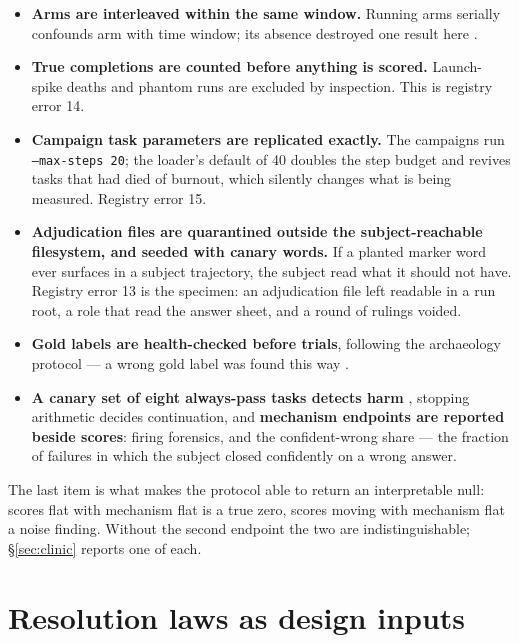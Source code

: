 \begin{itemize}
  \item \textbf{Arms are interleaved within the same window.} Running arms
        serially confounds arm with time window; its absence destroyed one
        result here .
  \item \textbf{True completions are counted before anything is scored.}
        Launch-spike deaths and phantom runs are excluded by inspection.
        This is registry error 14.
  \item \textbf{Campaign task parameters are replicated exactly.} The
        campaigns run \texttt{--max-steps 20}; the loader's default of 40
        doubles the step budget and revives tasks that had died of burnout,
        which silently changes what is being measured. Registry error 15.
  \item \textbf{Adjudication files are quarantined outside the
        subject-reachable filesystem, and seeded with canary words.} If a
        planted marker word ever surfaces in a subject trajectory, the
        subject read what it should not have. Registry error 13 is the
        specimen: an adjudication file left readable in a run root, a role
        that read the answer sheet, and a round of rulings voided.
  \item \textbf{Gold labels are health-checked before trials}, following
        the archaeology protocol --- a wrong gold label was found this way
        .
  \item \textbf{A canary set of eight always-pass tasks detects harm}
        , stopping arithmetic decides continuation, and
        \textbf{mechanism endpoints are reported beside scores}: firing
        forensics, and the confident-wrong share --- the fraction of
        failures in which the subject closed confidently on a wrong
        answer.
\end{itemize}

The last item is what makes the protocol able to return an interpretable
null: scores flat with mechanism flat is a true zero, scores moving with
mechanism flat a noise finding. Without the second endpoint the two are
indistinguishable; \S\ref{sec:clinic} reports one of each.

\section{Resolution laws as design inputs}
\label{sec:resolution}

